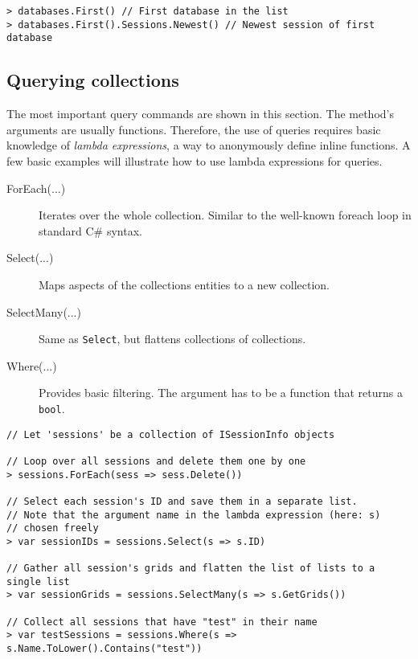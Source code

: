 \begin{lstlisting}[title=Picking entities with LINQ]
> databases.First() // First database in the list
> databases.First().Sessions.Newest() // Newest session of first database
\end{lstlisting}

\subsection{Querying collections}
The most important query commands are shown in this section.
The method's arguments are usually functions. Therefore, the use of queries requires basic knowledge of \emph{lambda expressions}, a way to anonymously define inline functions.
A few basic examples will illustrate how to use lambda expressions for queries.
\begin{description}
	\item[ForEach(...)]
	Iterates over the whole collection. Similar to the well-known foreach loop in standard C\# syntax.
	
	\item[Select(...)]
	Maps aspects of the collections entities to a new collection.
	
	\item[SelectMany(...)]
	Same as \lstinline{Select}, but flattens collections of collections.
	
	\item[Where(...)]
	Provides basic filtering. The argument has to be a function that returns a \lstinline{bool}.
\end{description}

\begin{lstlisting}[title=Querying collections with LINQ]
// Let 'sessions' be a collection of ISessionInfo objects

// Loop over all sessions and delete them one by one
> sessions.ForEach(sess => sess.Delete())

// Select each session's ID and save them in a separate list.
// Note that the argument name in the lambda expression (here: s)
// chosen freely
> var sessionIDs = sessions.Select(s => s.ID)

// Gather all session's grids and flatten the list of lists to a single list
> var sessionGrids = sessions.SelectMany(s => s.GetGrids())

// Collect all sessions that have "test" in their name
> var testSessions = sessions.Where(s => s.Name.ToLower().Contains("test"))
\end{lstlisting}

